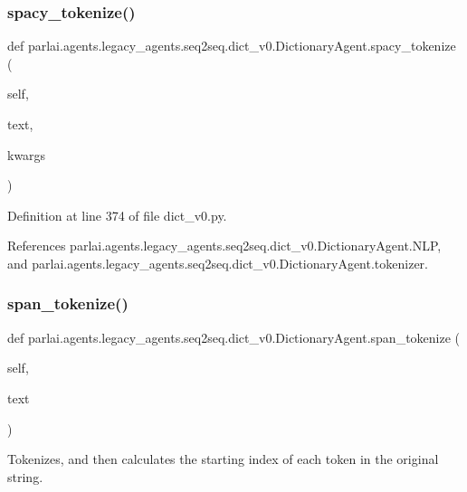 \subsubsection{\texorpdfstring{spacy\+\_\+tokenize()}{spacy\_tokenize()}}
{\footnotesize\ttfamily def parlai.\+agents.\+legacy\+\_\+agents.\+seq2seq.\+dict\+\_\+v0.\+Dictionary\+Agent.\+spacy\+\_\+tokenize (\begin{DoxyParamCaption}\item[{}]{self,  }\item[{}]{text,  }\item[{}]{kwargs }\end{DoxyParamCaption})}



Definition at line 374 of file dict\+\_\+v0.\+py.



References parlai.\+agents.\+legacy\+\_\+agents.\+seq2seq.\+dict\+\_\+v0.\+Dictionary\+Agent.\+N\+LP, and parlai.\+agents.\+legacy\+\_\+agents.\+seq2seq.\+dict\+\_\+v0.\+Dictionary\+Agent.\+tokenizer.

\mbox{\label{classparlai_1_1agents_1_1legacy__agents_1_1seq2seq_1_1dict__v0_1_1DictionaryAgent_acb9c4128aa95e0a6dcd787c33395c877}} 
\subsubsection{\texorpdfstring{span\+\_\+tokenize()}{span\_tokenize()}}
{\footnotesize\ttfamily def parlai.\+agents.\+legacy\+\_\+agents.\+seq2seq.\+dict\+\_\+v0.\+Dictionary\+Agent.\+span\+\_\+tokenize (\begin{DoxyParamCaption}\item[{}]{self,  }\item[{}]{text }\end{DoxyParamCaption})}

\begin{DoxyVerb}Tokenizes, and then calculates the starting index of each token in
the original string.
\end{DoxyVerb}
 

